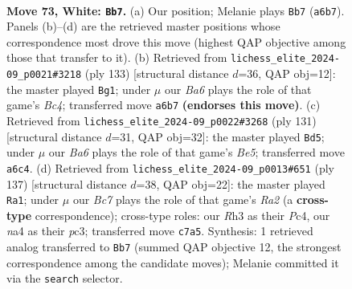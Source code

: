 \documentclass[11pt]{article}
\begin{document}
\clearpage

\begin{figure}[p]\centering
\begin{subfigure}{0.46\textwidth}\centering
\resizebox{\linewidth}{!}{%
\newchessgame
\chessboard[
  setfen={r7/2B5/B2p1k1p/4p1b1/n3P2p/5P1R/4K3/8 w - - 15 73},
  showmover=false,
  pgfstyle=straightmove, color=movearrow, markmove={a6-b7}
]}
\caption{}
\end{subfigure}\hfill
\begin{subfigure}{0.46\textwidth}\centering
\resizebox{\linewidth}{!}{%
\newchessgame
\chessboard[
  setfen={8/6k1/P1R2p2/2b2Pp1/4K1Pp/5B2/7r/8 b - - 3 67},
  showmover=false,
  pgfstyle=straightmove, color=movearrow, markmove={c5-g1}
]}
\caption{}
\end{subfigure}
\\[4pt]
\begin{subfigure}{0.46\textwidth}\centering
\resizebox{\linewidth}{!}{%
\newchessgame
\chessboard[
  setfen={8/3r4/3P1kp1/7p/2R1bB1K/4P1P1/8/8 b - - 16 66},
  showmover=false,
  pgfstyle=straightmove, color=movearrow, markmove={e4-d5}
]}
\caption{}
\end{subfigure}\hfill
\begin{subfigure}{0.46\textwidth}\centering
\resizebox{\linewidth}{!}{%
\newchessgame
\chessboard[
  setfen={4R1b1/r6k/8/4B1pP/2pP4/2P2pKP/5P2/8 b - - 2 69},
  showmover=false,
  pgfstyle=straightmove, color=movearrow, markmove={a7-a1}
]}
\caption{}
\end{subfigure}
\caption{\textbf{Move 73, White: \texttt{Bb7}.} (a) Our position; Melanie plays \texttt{Bb7} (\texttt{a6b7}). Panels (b)--(d) are the retrieved master positions whose correspondence most drove this move (highest QAP objective among those that transfer to it). (b) Retrieved from \texttt{lichess\_elite\_2024-09\_p0021\#3218} (ply 133) [structural distance $d$=36, QAP obj=12]: the master played \texttt{Bg1}; under $\mu$ our \emph{Ba6} plays the role of that game's \emph{Bc4}; transferred move \texttt{a6b7} \textbf{(endorses this move)}. (c) Retrieved from \texttt{lichess\_elite\_2024-09\_p0022\#3268} (ply 131) [structural distance $d$=31, QAP obj=32]: the master played \texttt{Bd5}; under $\mu$ our \emph{Ba6} plays the role of that game's \emph{Be5}; transferred move \texttt{a6c4}. (d) Retrieved from \texttt{lichess\_elite\_2024-09\_p0013\#651} (ply 137) [structural distance $d$=38, QAP obj=22]: the master played \texttt{Ra1}; under $\mu$ our \emph{Bc7} plays the role of that game's \emph{Ra2} (a \textbf{cross-type} correspondence); cross-type roles: our \emph{R}h3 as their \emph{P}c4, our \emph{n}a4 as their \emph{p}c3; transferred move \texttt{c7a5}. Synthesis: 1 retrieved analog transferred to \texttt{Bb7} (summed QAP objective 12, the strongest correspondence among the candidate moves); Melanie committed it via the \texttt{search} selector.}
\label{fig:thought-m144}
\end{figure}
\end{document}
